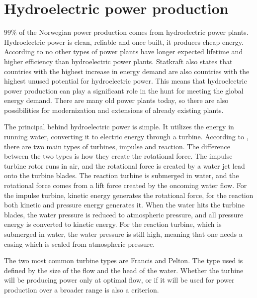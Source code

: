 \section{Hydroelectric power production}\label{ref:sec_hydropower}
    $99\%$ of the Norwegian power production comes from hydroelectric power plants. Hydroelectric power is clean, reliable and once built, it produces cheap energy. According to \cite{Statkraft2009} no other types of power plants have longer expected lifetime and higher efficiency than hydroelectric power plants. Statkraft also states that countries with the highest increase in energy demand are also countries with the highest unused potential for hydroelectric power. This means that hydroelectric power production can play a significant role in the hunt for meeting the global energy demand. There are many old power plants today, so there are also possibilities for modernization and extensions of already existing plants. 
    
    The principal behind hydroelectric power is simple. It utilizes the energy in running water, converting it to electric energy through a turbine. According to \cite{Paish2002}, there are two main types of turbines, impulse and reaction. The difference between the two types is how they create the rotational force. The impulse turbine rotor runs in air, and the rotational force is created by a water jet lead onto the turbine blades. The reaction turbine is submerged in water, and the rotational force comes from a lift force created by the oncoming water flow. For the impulse turbine, kinetic energy generates the rotational force, for the reaction both kinetic and pressure energy generates it. When the water hits the turbine blades, the water pressure is reduced to atmospheric pressure, and all pressure energy is converted to kinetic energy. For the reaction turbine, which is submerged in water, the water pressure is still high, meaning that one needs a casing which is sealed from atmospheric pressure. 
    
    
    
    The two most common turbine types are Francis and Pelton. The type used is defined by the size of the flow and the head of the water. Whether the turbine will be producing power only at optimal flow, or if it will be used for power production over a broader range is also a criterion. 
    
